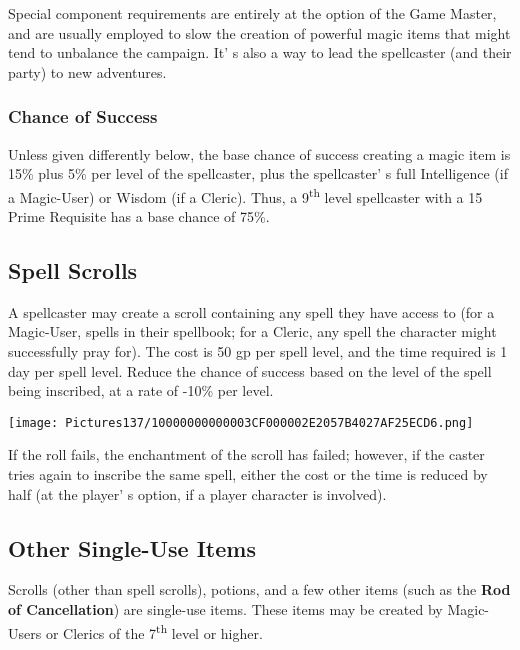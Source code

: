 \documentclass[a4paper,twoside,openany,10pt]{book}
\begin{document}
\begin{multicols}{2}
Special component requirements are entirely at the option of the Game Master, and are usually employed to slow the creation of powerful magic items that might tend to unbalance the campaign. It' s also a way to lead the spellcaster (and their party) to new adventures.

\subsubsection{Chance of Success}\label{chance-of-success}

Unless given differently below, the base chance of success creating a magic item is 15\% plus 5\% per level of the spellcaster, plus the spellcaster' s full Intelligence (if a Magic-User) or Wisdom (if a Cleric). Thus, a 9\textsuperscript{th} level spellcaster with a 15 Prime Requisite has a base chance of 75\%.

\subsection{Spell Scrolls}\label{spell-scrolls}

A spellcaster may create a scroll containing any spell they have access to (for a Magic-User, spells in their spellbook; for a Cleric, any spell the character might successfully pray for). The cost is 50 gp per spell level, and the time required is 1 day per spell level. Reduce the chance of success based on the level of the spell being inscribed, at a rate of -10\% per level.

\begin{center}
	\texttt{[image: Pictures137/10000000000003CF000002E2057B4027AF25ECD6.png]}
\end{center}

If the roll fails, the enchantment of the scroll has failed; however, if the caster tries again to inscribe the same spell, either the cost or the time is reduced by half (at the player' s option, if a player character is involved).

\subsection{Other Single-Use Items}\label{other-single-use-items}

Scrolls (other than spell scrolls), potions, and a few other items (such as the \textbf{Rod of Cancellation}) are single-use items. These items may be created by Magic-Users or Clerics of the 7\textsuperscript{th} level or higher.


\end{multicols}
\end{document}
